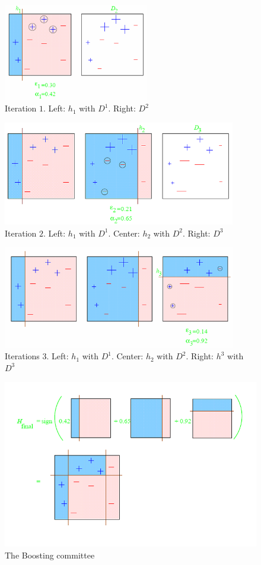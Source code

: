 \begin{figure}[H]
  \centering
  \includegraphics[width=2.5in]{boosting_toy1.png}
  \caption{Iteration $1$. Left: $h_1$ with $D^1$. Right: $D^2$ }

\end{figure}
\begin{figure}[H]
  \centering
  \includegraphics[width=4in]{boosting_toy2.png}
  \caption{Iteration $2$.  Left: $h_1$ with $D^1$. Center:
  $h_2$ with $D^2$. Right: $D^3$}
\end{figure}
\begin{figure}[H]
  \centering
  \includegraphics[width=4in]{boosting_toy3.png}
  \caption{Iterations $3$. Left: $h_1$ with $D^1$. 
  Center: $h_2$ with $D^2$. Right: $h^3$ with $D^3$}
\end{figure}
\begin{figure}[H]
  \centering
  \includegraphics[width=5in]{boosting_final.png}
  \caption{The Boosting committee}
\end{figure}



